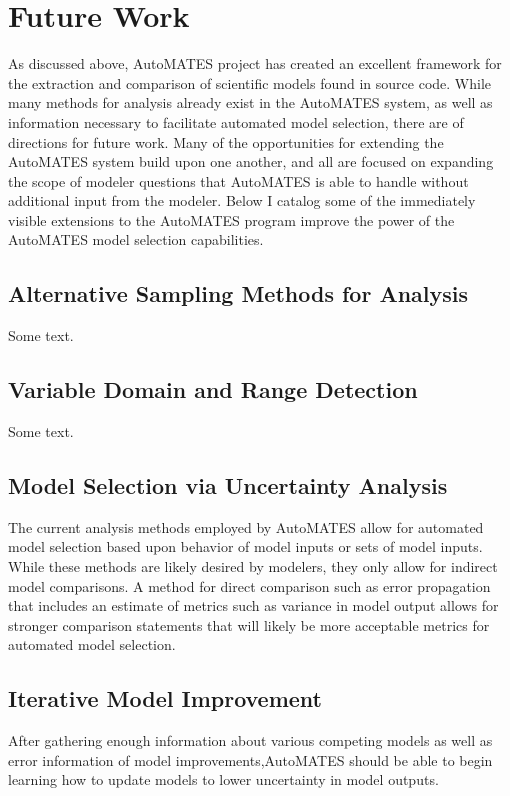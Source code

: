 \section{Future Work\label{sec:future_work}}
As discussed above,  AutoMATES project has created an excellent framework for the extraction and comparison of scientific models found in source code. While many methods for analysis already exist in the AutoMATES system, as well as information necessary to facilitate automated model selection, there are  %
of directions for future work. Many of the opportunities for extending the AutoMATES system build upon one another, and all are focused on expanding the scope of modeler questions that AutoMATES is able to handle without additional input from the modeler. Below I catalog some of the immediately visible extensions to the AutoMATES program improve the power of the AutoMATES model selection capabilities.

\subsection{Alternative Sampling Methods for Analysis\label{sec:alt_sampling}}
Some text.

\subsection{Variable Domain and Range Detection\label{sec:var_domain_range}}
Some text.

\subsection{Model Selection via Uncertainty Analysis \label{auto_uncert_analysis}}
The current analysis methods employed by AutoMATES allow for automated model selection based upon behavior of model inputs or sets of model inputs. While these methods are likely desired by modelers, they only allow for indirect model comparisons. A method for direct comparison such as error propagation that includes an estimate of metrics such as variance in model output allows for stronger comparison statements that will likely be more acceptable metrics for automated model selection.

\subsection{Iterative Model Improvement\label{sec:auto_improve}}
After gathering enough information about various competing models as well as error information of model improvements,AutoMATES should be able to begin learning how to update models to lower uncertainty in model outputs.

